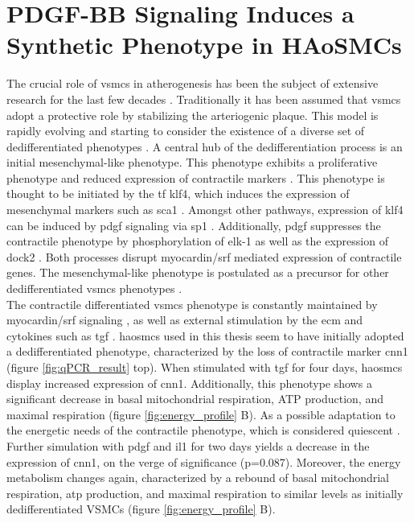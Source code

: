 \section{PDGF-BB Signaling Induces a Synthetic Phenotype in HAoSMCs}
The crucial role of \acp{vsmc} in atherogenesis has been the subject of extensive research for the last few decades \cite{grootaertVascularSmoothMuscle2021, yapSixShadesVascular2021}. Traditionally it has been assumed that \acp{vsmc} adopt a protective role by stabilizing the arteriogenic plaque. This model is rapidly evolving and starting to consider the existence of a diverse set of dedifferentiated phenotypes \cite{liuSmoothMuscleCell2019}. A central hub of the dedifferentiation process is an initial mesenchymal-like phenotype. This phenotype exhibits a proliferative phenotype and reduced expression of contractile markers \cite{yapSixShadesVascular2021}. This phenotype is thought to be initiated by the \ac{tf} \ac{klf4}, which induces the expression of mesenchymal markers such as \ac{sca1} \cite{yapSixShadesVascular2021}. Amongst other pathways, expression of \ac{klf4} can be induced by \ac{pdgf} signaling \cite{liuKruppellikeFactorAbrogates2005} via \ac{sp1} \cite{deatonSp1dependentActivationKLF42009}. Additionally, \ac{pdgf} suppresses the contractile phenotype by phosphorylation of \ac{elk-1} \cite{wangMyocardinTernaryComplex2004} as well as the expression of \ac{dock2} \cite{guoDedicatorCytokinesisNovel2015}. Both processes disrupt myocardin/\ac{srf} mediated expression of contractile genes. The mesenchymal-like phenotype is postulated as a precursor for other dedifferentiated \acp{vsmc} phenotypes \cite{yapSixShadesVascular2021}.\\
The contractile differentiated \acp{vsmc} phenotype is constantly maintained by myocardin/\ac{srf} signaling \cite{longMyocardinSufficientSmooth2008}, as well as external stimulation by the \ac{ecm} and cytokines such as \ac{tgf} \cite{davis-dusenberyDownregulationKruppellikeFactor42011}. \acp{haosmc} used in this thesis seem to have initially adopted a dedifferentiated phenotype, characterized by the loss of contractile marker \ac{cnn1} \cite{owensMolecularRegulationVascular2004} (figure \ref{fig:qPCR_result} top). When stimulated with \ac{tgf} for four days, \acp{haosmc} display increased expression of \ac{cnn1}. Additionally, this phenotype shows a significant decrease in  basal mitochondrial respiration, ATP production, and maximal respiration (figure \ref{fig:energy_profile} B). As a possible adaptation to the energetic needs of the contractile phenotype, which is considered quiescent \cite{dobnikarDiseaserelevantTranscriptionalSignatures2018}. Further simulation with \ac{pdgf} and \ac{il1} for two days yields a decrease in the expression of \ac{cnn1}, on the verge of significance (p=0.087). Moreover, the energy metabolism changes again, characterized by a rebound of basal mitochondrial respiration, \ac{atp} production, and maximal respiration to similar levels as initially dedifferentiated VSMCs (figure \ref{fig:energy_profile} B).\\

